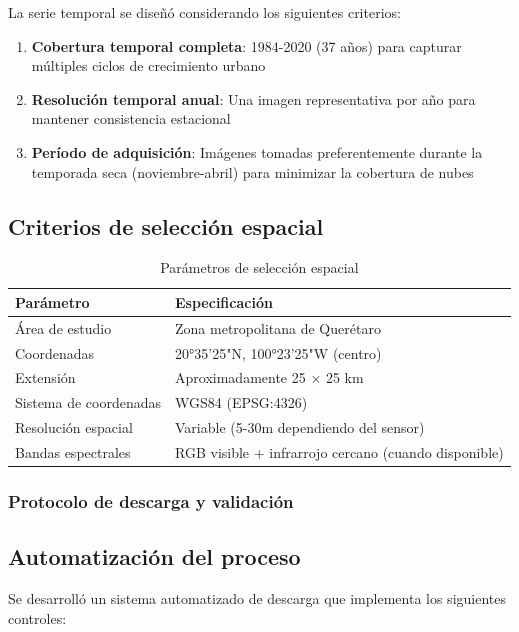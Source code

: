La serie temporal se diseñó considerando los siguientes criterios:

\begin{enumerate}
	\item \textbf{Cobertura temporal completa}: 1984-2020 (37 años) para capturar múltiples ciclos de crecimiento urbano
	\item \textbf{Resolución temporal anual}: Una imagen representativa por año para mantener consistencia estacional
	\item \textbf{Período de adquisición}: Imágenes tomadas preferentemente durante la temporada seca (noviembre-abril) para minimizar la cobertura de nubes
\end{enumerate}

\subsection{Criterios de selección espacial}

\begin{table}[h]
\centering
\caption{Parámetros de selección espacial}
\begin{tabular}{|l|l|}
\hline
	\textbf{Parámetro} & \textbf{Especificación} \\
\hline
Área de estudio & Zona metropolitana de Querétaro \\
Coordenadas & 20°35'25"N, 100°23'25"W (centro) \\
Extensión & Aproximadamente 25 × 25 km \\
Sistema de coordenadas & WGS84 (EPSG:4326) \\
Resolución espacial & Variable (5-30m dependiendo del sensor) \\
Bandas espectrales & RGB visible + infrarrojo cercano (cuando disponible) \\
\hline
\end{tabular}
\label{tab:spatial_criteria}
\end{table}

\subsubsection{Protocolo de descarga y validación}

\subsection{Automatización del proceso}

Se desarrolló un sistema automatizado de descarga que implementa los siguientes controles:

